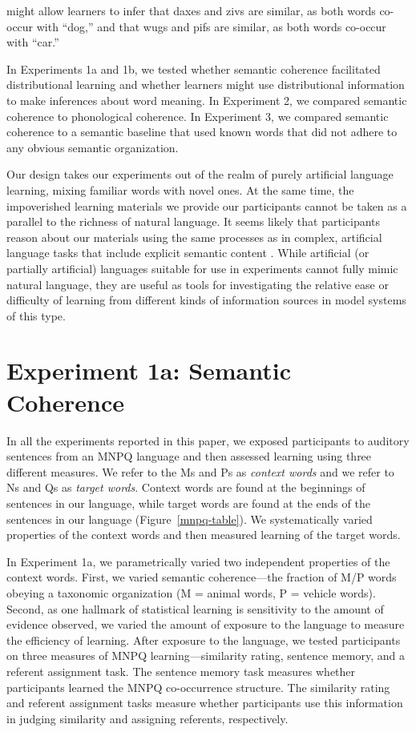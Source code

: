 \documentclass[man,floatsintext]{apa6}
\begin{document}
\noindent might allow learners to infer that daxes and zivs are similar, as both words co-occur with ``dog,'' and that wugs and pifs are similar, as both words co-occur with ``car.''

In Experiments 1a and 1b, we tested whether semantic coherence facilitated distributional learning and whether learners might use distributional information to make inferences about word meaning. In Experiment 2, we compared semantic coherence to phonological coherence. In Experiment 3, we compared semantic coherence to a semantic baseline that used known words that did not adhere to any obvious semantic organization.

Our design takes our experiments out of the realm of purely artificial language learning, mixing familiar words with novel ones.
At the same time, the impoverished learning materials we provide our participants cannot be taken as a parallel to the richness of natural language.
It seems likely that participants reason about our materials using the same processes as in complex, artificial language tasks that include explicit semantic content \citep{braine1987}.
While artificial (or partially artificial) languages suitable for use in experiments cannot fully mimic natural language, they are useful as tools for investigating the relative ease or difficulty of learning from different kinds of information sources in model systems of this type.


\section{Experiment 1a: Semantic Coherence}

In all the experiments reported in this paper, we exposed participants to auditory sentences from an MNPQ language and then assessed learning using three different measures. We refer to the Ms and Ps as \emph{context words} and we refer to Ns and Qs as \emph{target words}. Context words are found at the beginnings of sentences in our language, while target words are found at the ends of the sentences in our language (Figure~\ref{mnpq-table}). We systematically varied properties of the context words and then measured learning of the target words.

In Experiment 1a, we parametrically varied two independent properties of the context words. First, we varied semantic coherence---the fraction of M/P words obeying a taxonomic organization (M = animal words, P = vehicle words). Second, as one hallmark of statistical learning is sensitivity to the amount of evidence observed, we varied the amount of exposure to the language to measure the efficiency of learning. After exposure to the language, we tested participants on three measures of MNPQ learning---similarity rating, sentence memory, and a referent assignment task. The sentence memory task measures whether participants learned the MNPQ co-occurrence structure. The similarity rating and referent assignment tasks measure whether participants use this information in judging similarity and assigning referents, respectively.
\end{document}
